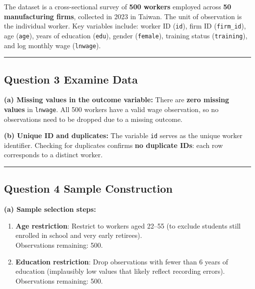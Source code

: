 \documentclass[paper=a4, fontsize=11pt]{scrartcl}
\newcommand{\horrule}[1]{\rule{\linewidth}{#1}}
\begin{document}
The dataset is a cross-sectional survey of \textbf{500 workers} employed across
\textbf{50 manufacturing firms}, collected in 2023 in Taiwan.
The unit of observation is the individual worker.
Key variables include: worker ID (\texttt{id}), firm ID (\texttt{firm\_id}),
age (\texttt{age}), years of education (\texttt{edu}), gender (\texttt{female}),
training status (\texttt{training}), and log monthly wage (\texttt{lnwage}).

\bigskip\horrule{0.4pt}\bigskip

\subsection*{Question 3 \quad Examine Data}

\textbf{(a) Missing values in the outcome variable:}
There are \textbf{zero missing values} in \texttt{lnwage}.
All 500 workers have a valid wage observation, so no observations need to be dropped
due to a missing outcome.

\textbf{(b) Unique ID and duplicates:}
The variable \texttt{id} serves as the unique worker identifier.
Checking for duplicates confirms \textbf{no duplicate IDs}: each row corresponds to
a distinct worker.

\bigskip\horrule{0.4pt}\bigskip

\subsection*{Question 4 \quad Sample Construction}

\textbf{(a) Sample selection steps:}

\begin{enumerate}[1.]
  \item \textbf{Age restriction}: Restrict to workers aged 22--55 (to exclude students
        still enrolled in school and very early retirees). \\
        Observations remaining: 500.
  \item \textbf{Education restriction}: Drop observations with fewer than 6 years of
        education (implausibly low values that likely reflect recording errors). \\
        Observations remaining: 500.
\end{enumerate}
\end{document}
